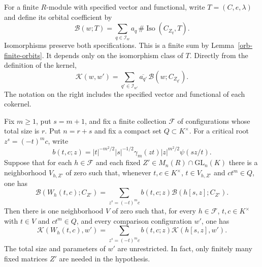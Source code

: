 For a finite $R$-module with specified vector and functional,
write $T=(C,e,\lambda)$ and define its orbital coefficient by
\begin{equation}\label{gu-orbital-coefficient}
 \mathcal B(w;T)=
       \sum_{q\in\mathcal I_w}a_q\,
                     \#\operatorname{Iso}(C_{Z_q},T).
\end{equation}
Isomorphisms preserve both specifications. This is a finite sum by
Lemma~\ref{orb-finite-orbits}. It depends only on the isomorphism
class of $T$. Directly from the definition of the kernel,
\begin{equation}\label{gu-kernel-coefficients}
 \mathcal K(w,w')=
       \sum_{q'\in\mathcal I_{w'}}\overline{a_{q'}}\,
                        \mathcal B(w;C_{Z_{q'}}).
\end{equation}
The notation on the right includes the specified vector and
functional of each cokernel.

\begin{proposition}\label{gu-uniform-germ}
Fix $m\ge1$, put $s=m+1$, and fix a finite collection
$\mathcal F$ of configurations whose total size is $r$.
Put $n=r+s$ and fix a compact set $Q\subset K^\times$.
For a critical root $z^s=(-t)^mc$, write
\[
 b(t,c;z)=|t|^{-m^2/2}|s|^{-1/2}
              \gamma_m(zt)|z|^{m^2/2}\psi(sz/t).
\]
Suppose that for each $h\in\mathcal F$ and each fixed
$Z'\in M_n(R)\cap\mathrm{GL}_n(K)$ there is a neighborhood
$V_{h,Z'}$ of zero such that, whenever $t,c\in K^\times$,
$t\in V_{h,Z'}$ and $ct^m\in Q$, one has
\begin{equation}\label{gu-pointwise-germ}
 \mathcal B(W_h(t,c);C_{Z'})
       =\sum_{z^s=(-t)^mc}
                 b(t,c;z)\mathcal B(h[s,z];C_{Z'}).
\end{equation}
Then there is one neighborhood $V$ of zero such that, for every
$h\in\mathcal F$, $t,c\in K^\times$ with $t\in V$ and
$ct^m\in Q$, and every comparison configuration $w'$, one has
\begin{equation}\label{gu-uniform-germ-conclusion}
 \mathcal K(W_h(t,c),w')
       =\sum_{z^s=(-t)^mc}
                    b(t,c;z)\mathcal K(h[s,z],w').
\end{equation}
The total size and parameters of $w'$ are unrestricted. In fact,
only finitely many fixed matrices $Z'$ are needed in the
hypothesis.
\end{proposition}

